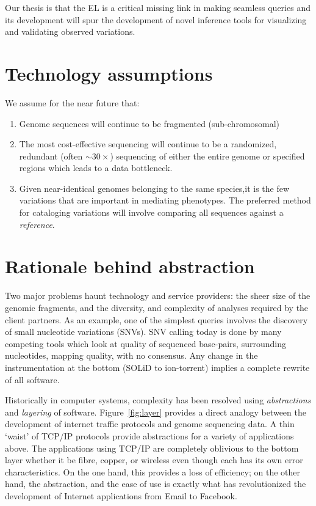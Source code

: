 \documentclass[10pt]{article}
\begin{document}
Our thesis is that the EL is a critical missing link in making
seamless queries and its development will spur the development of
novel inference tools for visualizing and validating observed
variations.

\section{Technology assumptions}

We assume for the near future that:

\begin{enumerate}
\item Genome sequences will continue to be fragmented
  (sub-chromosomal)
\item The most cost-effective sequencing will continue to be a
  randomized, redundant (often $\sim 30\times$) sequencing of either the entire genome or
  specified regions which leads to a data bottleneck.
\item Given near-identical genomes belonging to the same species,it is the few variations that
  are important in mediating phenotypes. The preferred method for
  cataloging variations will involve comparing all sequences against a
  \emph{reference}.
\end{enumerate}

\section{Rationale behind abstraction}

Two major problems haunt technology and service providers: the sheer
size of the genomic fragments, and the diversity, and
complexity of analyses required by the client partners. As an example, one of the 
simplest queries involves the discovery of small nucleotide
variations (SNVs). SNV calling today is done by many competing tools
which look at quality of sequenced base-pairs, surrounding
nucleotides, mapping quality, with no consensus. Any change in the instrumentation at 
the bottom (SOLiD to
ion-torrent) implies a complete rewrite of all software.

Historically in computer systems, complexity has been resolved using
\emph{abstractions} and \emph{layering} of software.
Figure~\ref{fig:layer} provides a direct analogy between the
development of internet traffic protocols and genome sequencing data.
A thin `waist' of TCP/IP protocols provide abstractions for a variety
of applications above. The applications using TCP/IP are completely
oblivious to the bottom layer whether it be fibre, copper, or wireless
even though each has its own error characteristics.  On the one hand,
this provides a loss of efficiency; on the other hand, the
abstraction, and the ease of use is exactly what has revolutionized
the development of Internet applications from Email to Facebook.
\end{document}
